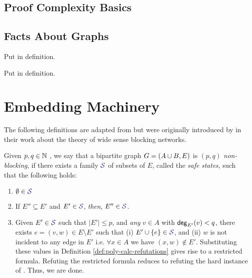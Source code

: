 \documentclass[11pt]{article}
\newcommand{\en}{\textcolor{ballblue}{n}}
\newcommand{\dee}{\textcolor{cadmiumgreen}{d}}
\newcommand{\eigen}{\textcolor{red}{\lambda}}
\newcommand{\EnDeeLambda}{(\en, \dee, \eigen)}
\begin{document}
\subsection{Proof Complexity Basics}

\begin{definition}\label{def:poly-calc-refutations}
	
\end{definition}

\subsection{Facts About Graphs}
\begin{definition}[$\EnDeeLambda$-Expander graphs]\label{def:expander-graphs}
Put in definition.    
\end{definition}

\begin{definition}\label{def:top-minor}
Put in definition.    
\end{definition}


\begin{lemma}
	
\end{lemma}


\section{Embedding Machinery}

The following definitions are adapted from \citep{nenadov2023routing} but were originally introduced by \citet{feldman1988wide} in their work about the theory of wide sense blocking networks.

\begin{definition}
Given $p, q \in \mathbb{N}$ , we say that a bipartite graph $G = (A \cup B, E)$ is $(p, q)$ \emph{non-blocking}, if there exists a family $\Family{S}$ of subsets of $E$, called the \emph{safe states}, such that the following holds:

\begin{enumerate}
	\item $\emptyset \in \Family{S}$
	\item If $E'' \subseteq E'$ and $E' \in \Family{S}$, \emph{then}, $E'' \in \Family{S}$.
	\item Given $E' \in \Family{S}$ such that $|E'| \leq p$, and \emph{any} $v \in A$ with $\mathsf{deg}_{E'}(v) < q$, there exists $e = (v, w) \in E \setminus E'$  such that (i) $E' \cup \Set{e} \in \SafeStates $, and (ii) $w$ is not incident to any edge in $E'$ i.e. $\forall x \in A$ we have $(x,w) \notin E'$. Substituting these values in Definition \ref{def:poly-calc-refutations} gives rise to a restricted formula. Refuting the restricted formula reduces to refuting the hard instance of . Thus, we are done.
\end{enumerate}

\end{definition}
\end{document}
